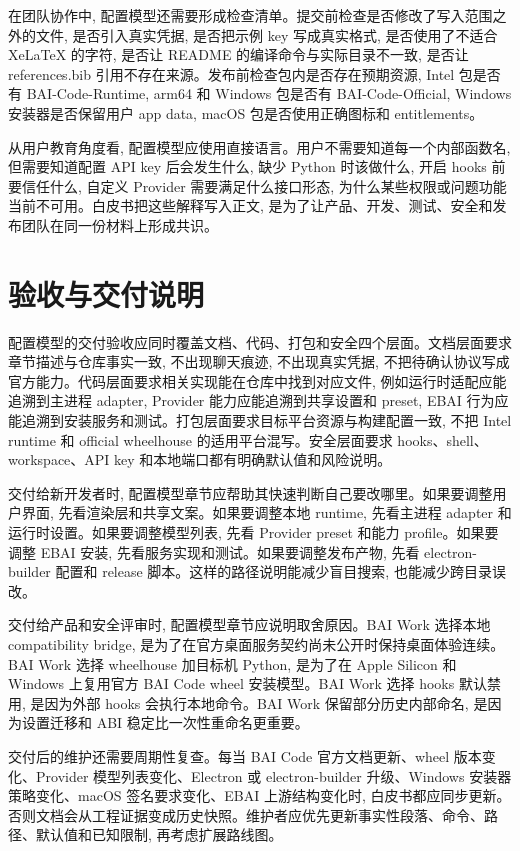 在团队协作中, 配置模型还需要形成检查清单。提交前检查是否修改了写入范围之外的文件, 是否引入真实凭据, 是否把示例 key 写成真实格式, 是否使用了不适合 XeLaTeX 的字符, 是否让 README 的编译命令与实际目录不一致, 是否让 references.bib 引用不存在来源。发布前检查包内是否存在预期资源, Intel 包是否有 BAI-Code-Runtime, arm64 和 Windows 包是否有 BAI-Code-Official, Windows 安装器是否保留用户 app data, macOS 包是否使用正确图标和 entitlements。

从用户教育角度看, 配置模型应使用直接语言。用户不需要知道每一个内部函数名, 但需要知道配置 API key 后会发生什么, 缺少 Python 时该做什么, 开启 hooks 前要信任什么, 自定义 Provider 需要满足什么接口形态, 为什么某些权限或问题功能当前不可用。白皮书把这些解释写入正文, 是为了让产品、开发、测试、安全和发布团队在同一份材料上形成共识。

\section{验收与交付说明}
配置模型的交付验收应同时覆盖文档、代码、打包和安全四个层面。文档层面要求章节描述与仓库事实一致, 不出现聊天痕迹, 不出现真实凭据, 不把待确认协议写成官方能力。代码层面要求相关实现能在仓库中找到对应文件, 例如运行时适配应能追溯到主进程 adapter, Provider 能力应能追溯到共享设置和 preset, EBAI 行为应能追溯到安装服务和测试。打包层面要求目标平台资源与构建配置一致, 不把 Intel runtime 和 official wheelhouse 的适用平台混写。安全层面要求 hooks、shell、workspace、API key 和本地端口都有明确默认值和风险说明。

交付给新开发者时, 配置模型章节应帮助其快速判断自己要改哪里。如果要调整用户界面, 先看渲染层和共享文案。如果要调整本地 runtime, 先看主进程 adapter 和运行时设置。如果要调整模型列表, 先看 Provider preset 和能力 profile。如果要调整 EBAI 安装, 先看服务实现和测试。如果要调整发布产物, 先看 electron-builder 配置和 release 脚本。这样的路径说明能减少盲目搜索, 也能减少跨目录误改。

交付给产品和安全评审时, 配置模型章节应说明取舍原因。BAI Work 选择本地 compatibility bridge, 是为了在官方桌面服务契约尚未公开时保持桌面体验连续。BAI Work 选择 wheelhouse 加目标机 Python, 是为了在 Apple Silicon 和 Windows 上复用官方 BAI Code wheel 安装模型。BAI Work 选择 hooks 默认禁用, 是因为外部 hooks 会执行本地命令。BAI Work 保留部分历史内部命名, 是因为设置迁移和 ABI 稳定比一次性重命名更重要。

交付后的维护还需要周期性复查。每当 BAI Code 官方文档更新、wheel 版本变化、Provider 模型列表变化、Electron 或 electron-builder 升级、Windows 安装器策略变化、macOS 签名要求变化、EBAI 上游结构变化时, 白皮书都应同步更新。否则文档会从工程证据变成历史快照。维护者应优先更新事实性段落、命令、路径、默认值和已知限制, 再考虑扩展路线图。

